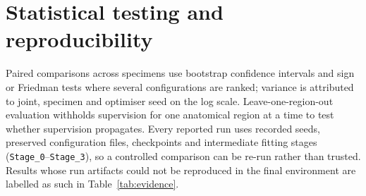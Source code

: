 \section{Statistical testing and reproducibility}

Paired comparisons across specimens use bootstrap confidence intervals and
sign or Friedman tests where several configurations are ranked; variance is
attributed to joint, specimen and optimiser seed on the log scale. Leave-one-region-out
evaluation withholds supervision for one anatomical region at a time to test
whether supervision propagates. Every reported run uses recorded seeds,
preserved configuration files, checkpoints and intermediate fitting stages
(\texttt{Stage\_0}--\texttt{Stage\_3}), so a controlled comparison can be
re-run rather than trusted. Results whose run artifacts could not be
reproduced in the final environment are labelled as such in
Table~\ref{tab:evidence}.
